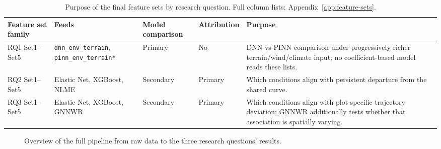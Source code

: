 \begin{table}[!htbp]
\centering
\scriptsize
\renewcommand{\arraystretch}{1.2}
\begin{tabular}{p{2.3cm}p{3.6cm}p{1.6cm}p{2cm}p{4cm}}
\toprule
Feature set family & Feeds & Model comparison & Attribution & Purpose \\
\midrule
RQ1 Set1--Set5 & \texttt{dnn\_env\_terrain}, \texttt{pinn\_env\_terrain*} & Primary & No & DNN-vs-PINN
comparison under progressively richer terrain/wind/climate input; no coefficient-based model
reads these lists. \\
RQ2 Set1--Set5 & Elastic Net, XGBoost, NLME & Secondary & Primary & Which conditions align with
persistent departure from the shared curve. \\
RQ3 Set1--Set5 & Elastic Net, XGBoost, GNNWR & Secondary & Primary & Which conditions align with
plot-specific trajectory deviation; GNNWR additionally tests whether that association is
spatially varying. \\
\bottomrule
\end{tabular}
\caption{Purpose of the final feature sets by research question. Full column lists: Appendix~\ref{app:feature-sets}.}
\label{tab:feature-set-purpose}
\end{table}

\begin{figure}[!htbp]
\centering
{}
\caption{Overview of the full pipeline from raw data to the three research questions' results.}
\label{fig:pipeline-overview}
\end{figure}

